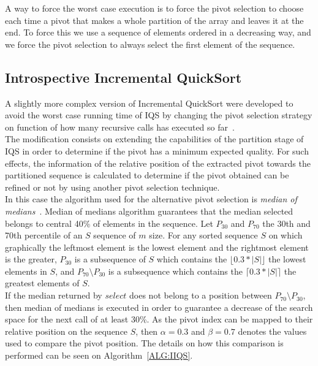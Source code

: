A way to force the worst case execution is to force the pivot selection to choose each time a pivot that makes a whole partition of the array and leaves it at the end. To force this we use a sequence of elements ordered in a decreasing way, and we force the pivot selection to always select the first element of the sequence.\\

\subsection{Introspective Incremental QuickSort}
\label{SUBSECTION:IIQS}

A slightly more complex version of Incremental QuickSort were developed to avoid the worst case running time of IQS by changing the pivot selection strategy on function of how many recursive calls has executed so far~\cite{7416566}.\\

The modification consists on extending the capabilities of the partition stage of IQS in order to determine if the pivot has a minimum expected quality. For such effects, the information of the relative position of the extracted pivot towards the partitioned sequence is calculated to determine if the pivot obtained can be refined or not by using another pivot selection technique.\\

In this case the algorithm used for the alternative pivot selection is \textit{median of medians}~\cite{Blum_Floyd_Pratt_Rivest_Tarjan_1973}. Median of medians algorithm guarantees that the median selected belongs to central 40\% of elements in the sequence. Let $P_{30}$ and $P_{70}$ the 30th and 70th percentile of an $S$ sequence of $m$ size. For any sorted sequence $S$ on which graphically the leftmost element is the lowest element and the rightmost element is the greater, $P_{30}$ is a subsequence of $S$ which contains the $\lfloor0.3*|S|\rfloor$ the lowest elements in $S$, and $P_{70} \setminus P_{30}$ is a subsequence which contains the $\lceil0.3*|S|\rceil$ the greatest elements of $S$.\\

If the median returned by $select$ does not belong to a position between $P_{70} \setminus P_{30}$, then median of medians is executed in order to guarantee a decrease of the search space for the next call of at least 30\%. As the pivot index can be mapped to their relative position on the sequence $S$, then $\alpha=0.3$ and $\beta=0.7$ denotes the values used to compare the pivot position. The details on how this comparison is performed can be seen on Algorithm~\ref{ALG:IIQS}.\\

